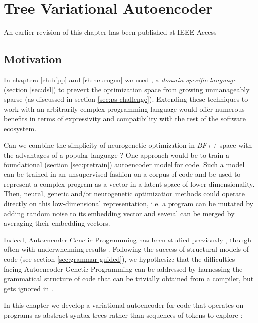 \chapter{Tree Variational Autoencoder}\label{ch:tree2tree}
\begin{remark}
    An earlier revision of this chapter \cite{liventsevTreeVariationalAutoencoder2025} has been published at IEEE Access
\end{remark}

\section{Motivation}

In chapters \ref{ch:bfpp} and \ref{ch:neurogen} we used , a \emph{domain-specific language} (section \ref{sec:dsl}) to prevent the optimization space from growing unmanageably sparse (as discussed in section \ref{sec:ps-challenge}).
Extending these techniques to work with an arbitrarily complex programming language would offer numerous benefits in terms of expressivity and compatibility with the rest of the software ecosystem.

Can we combine the simplicity of neurogenetic optimization in \emph{BF++} space with the advantages of a popular language \cite{tiobe2017tiobe}?
One approach would be to train a foundational (section \ref{sec:pretrain}) autoencoder \cite{autoencoders} model for code.
Such a model can be trained in an unsupervised fashion on a corpus of code and be used to represent a complex program as a vector in a latent space of lower dimensionality.
Then, neural, genetic and/or neurogenetic optimization methods could operate directly on this low-dimensional representation, i.e. a program can be mutated by adding random noise to its embedding vector and several can be merged by averaging their embedding vectors.

Indeed, Autoencoder Genetic Programming has been studied previously \cite{wittenbergDenoisingAutoencoderGenetic2023,latentspaceopt}, though often with underwhelming results \cite{autoenc-gp}.
Following the success of structural models of code (see section \ref{sec:grammar-guided}), we hypothesize that the difficulties facing Autoencoder Genetic Programming can be addressed by harnessing the grammatical structure of code that can be trivially obtained from a compiler, but gets ignored in \cite{wittenbergDenoisingAutoencoderGenetic2023,latentspaceopt,autoenc-gp}.

In this chapter we develop a variational autoencoder for code that operates on programs as abstract syntax trees rather than sequences of tokens to explore \rqtree:

